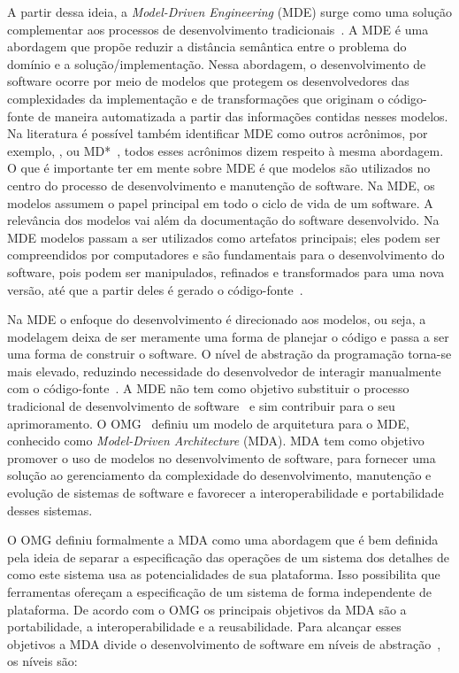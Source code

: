 A partir dessa ideia, a \textit{Model-Driven Engineering} (MDE) surge como uma solução complementar aos processos de desenvolvimento tradicionais~\cite{Lima_2007}. A MDE é uma abordagem que propõe reduzir a distância semântica entre o problema do domínio e a solução/implementação. Nessa abordagem, o desenvolvimento de software ocorre por meio de modelos que protegem os desenvolvedores das complexidades da implementação e de transformações que originam o código-fonte de maneira automatizada a partir das informações contidas nesses modelos. Na literatura é possível também identificar MDE como outros acrônimos, por exemplo, ,  ou MD*~\cite{Kleppe:2003}, todos esses acrônimos dizem respeito à mesma abordagem. O que é importante ter em mente sobre MDE é que modelos são utilizados no centro do processo de desenvolvimento e manutenção de software. Na MDE, os modelos assumem o papel principal em todo o ciclo de vida de um software. A relevância dos modelos vai além da documentação do software desenvolvido. Na MDE modelos passam a ser utilizados como artefatos principais; eles podem ser compreendidos por computadores e são fundamentais para o desenvolvimento do software, pois podem ser manipulados, refinados e transformados para uma nova versão, até que a partir deles é gerado o código-fonte~\cite{Kleppe:2003, Brown_2007, Ben_Ammar}.

Na MDE o enfoque do desenvolvimento é direcionado aos modelos, ou seja, a modelagem deixa de ser meramente uma forma de planejar o código e passa a ser uma forma de construir o software. O nível de abstração da programação torna-se mais elevado, reduzindo necessidade do desenvolvedor de interagir manualmente com o código-fonte~\cite{Braganca_Machado}. A MDE não tem como objetivo substituir o processo tradicional de desenvolvimento de software~\cite{Kleppe:2003, Brown_2007, Braganca_Machado} e sim contribuir para o seu aprimoramento. O OMG~\cite{ADM:OMG} definiu um modelo de arquitetura para o MDE, conhecido como \emph{Model-Driven Architecture} (MDA). MDA tem como objetivo promover o uso de modelos no desenvolvimento de software, para fornecer uma solução ao gerenciamento da complexidade do desenvolvimento, manutenção e evolução de sistemas de software e favorecer a interoperabilidade e portabilidade desses sistemas.

O OMG definiu formalmente a MDA como uma abordagem que é bem definida pela ideia de separar a especificação das operações de um sistema dos detalhes de como este sistema usa as potencialidades de sua plataforma. Isso possibilita que ferramentas ofereçam a especificação de um sistema de forma independente de plataforma. De acordo com o OMG os principais objetivos da MDA são a portabilidade, a interoperabilidade e a reusabilidade. Para alcançar esses objetivos a MDA divide o desenvolvimento de software em níveis de abstração~\cite{France_2007, Ben_Ammar}, os níveis são:

